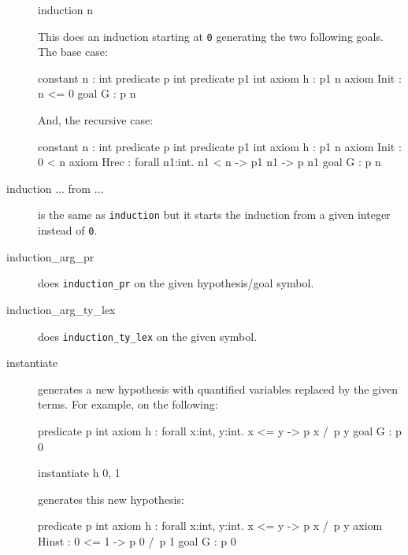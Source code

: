 \begin{description}
\begin{transwhy3}
induction n
\end{transwhy3}

This does an induction starting at \texttt{0} generating the two following
goals. The base case:
\begin{whycode}
constant n : int
predicate p int
predicate p1 int
axiom h : p1 n
axiom Init : n <= 0
goal G : p n
\end{whycode}

And, the recursive case:

\begin{whycode}
constant n : int
predicate p int
predicate p1 int
axiom h : p1 n
axiom Init : 0 < n
axiom Hrec : forall n1:int. n1 < n -> p1 n1 -> p n1
goal G : p n
\end{whycode}


\item[induction ... from ...] is the same as \texttt{induction} but it starts
  the induction from a given integer instead of \texttt{0}.

\item[induction\_arg\_pr] does \texttt{induction\_pr} on the given
  hypothesis/goal symbol.


\item[induction\_arg\_ty\_lex] does \texttt{induction\_ty\_lex} on the given
  symbol.


\item[instantiate] generates a new hypothesis with quantified variables
  replaced by the given terms. For example, on the following:

\begin{whycode}
predicate p int
axiom h : forall x:int, y:int. x <= y -> p x /\ p y
goal G : p 0
\end{whycode}

\begin{transwhy3}
instantiate h 0, 1
\end{transwhy3}

generates this new hypothesis:
\begin{whycode}
predicate p int
axiom h : forall x:int, y:int. x <= y -> p x /\ p y
axiom Hinst : 0 <= 1 -> p 0 /\ p 1
goal G : p 0
\end{whycode}


\end{description}
